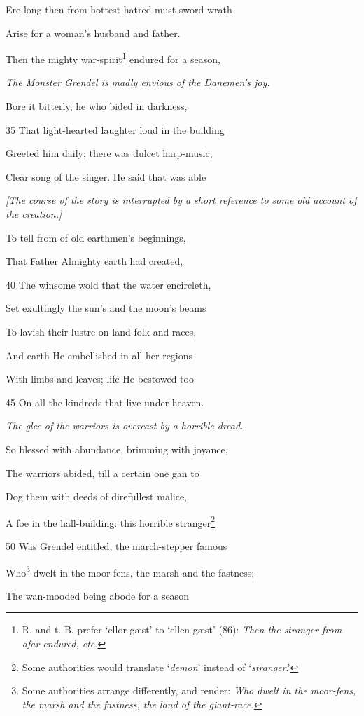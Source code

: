 Ere long then from hottest hatred must sword-wrath

Arise for a woman’s husband and father.

Then the mighty war-spirit\footnote{R. and t. B. prefer ‘ellor-gæst’ to ‘ellen-gæst’ (86): \emph{Then the stranger
from afar endured, etc.}} endured for a season,

\emph{The Monster Grendel
is madly envious
of the Danemen’s
joy.}

Bore it bitterly, he who bided in darkness,

35
That light-hearted laughter loud in the building

Greeted him daily; there was dulcet harp-music,

Clear song of the singer. He said that was able

\emph{[The course of the
story is interrupted
by a short reference
to some old account of the
creation.]}

To tell from of old earthmen’s beginnings,

That Father Almighty earth had created,

40
The winsome wold that the water encircleth,

Set exultingly the sun’s and the moon’s beams

To lavish their lustre on land-folk and races,

And earth He embellished in all her regions

With limbs and leaves; life He bestowed too

45
On all the kindreds that live under heaven.

\emph{The glee of the
warriors is overcast
by a horrible
dread.}

So blessed with abundance, brimming with joyance,

The warriors abided, till a certain one gan to

Dog them with deeds of direfullest malice,

A foe in the hall-building: this horrible stranger\footnote{Some authorities would translate ‘\emph{demon}’ instead of ‘\emph{stranger}.’}

50
Was Grendel entitled, the march-stepper famous

Who\footnote{Some authorities arrange differently, and render: \emph{Who dwelt in the moor-fens,
the marsh and the fastness, the land of the giant-race.}} dwelt in the moor-fens, the marsh and the fastness;

The wan-mooded being abode for a season

